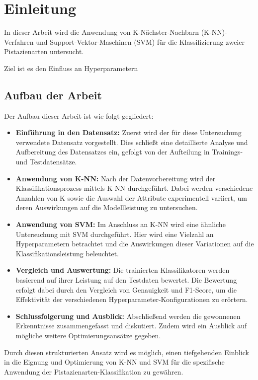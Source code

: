 
\section{Einleitung}
In dieser Arbeit wird die Anwendung von K-Nächster-Nachbarn (K-NN)-Verfahren und Support-Vektor-Maschinen (SVM) für die Klassifizierung zweier Pistazienarten untersucht. 

Ziel ist es den Einfluss an Hyperparametern 

\subsection*{Aufbau der Arbeit}
Der Aufbau dieser Arbeit ist wie folgt gegliedert:
\begin{itemize}
	\item \textbf{Einführung in den Datensatz:} Zuerst wird der für diese Untersuchung verwendete Datensatz vorgestellt. Dies schließt eine detaillierte Analyse und Aufbereitung des Datensatzes ein, gefolgt von der Aufteilung in Trainings- und Testdatensätze.
	\item \textbf{Anwendung von K-NN:} Nach der Datenvorbereitung wird der Klassifikationsprozess mittels K-NN durchgeführt. Dabei werden verschiedene Anzahlen von \glqq{}K\grqq{} sowie die Auswahl der Attribute experimentell variiert, um deren Auswirkungen auf die Modellleistung zu untersuchen.
	\item \textbf{Anwendung von SVM:} Im Anschluss an K-NN wird eine ähnliche Untersuchung mit SVM durchgeführt. Hier wird eine Vielzahl an Hyperparametern betrachtet und die Auswirkungen dieser Variationen auf die Klassifikationsleistung beleuchtet.
	\item \textbf{Vergleich und Auswertung:} Die trainierten Klassifikatoren werden basierend auf ihrer Leistung auf den Testdaten bewertet. Die Bewertung erfolgt dabei durch den Vergleich von Genauigkeit und F1-Score, um die Effektivität der verschiedenen Hyperparameter-Konfigurationen zu erörtern.
	\item \textbf{Schlussfolgerung und Ausblick:} Abschließend werden die gewonnenen Erkenntnisse zusammengefasst und diskutiert. Zudem wird ein Ausblick auf mögliche weitere Optimierungsansätze gegeben.
\end{itemize}

Durch diesen strukturierten Ansatz wird es möglich, einen tiefgehenden Einblick in die Eignung und Optimierung von K-NN und SVM für die spezifische Anwendung der Pistazienarten-Klassifikation zu gewähren.
